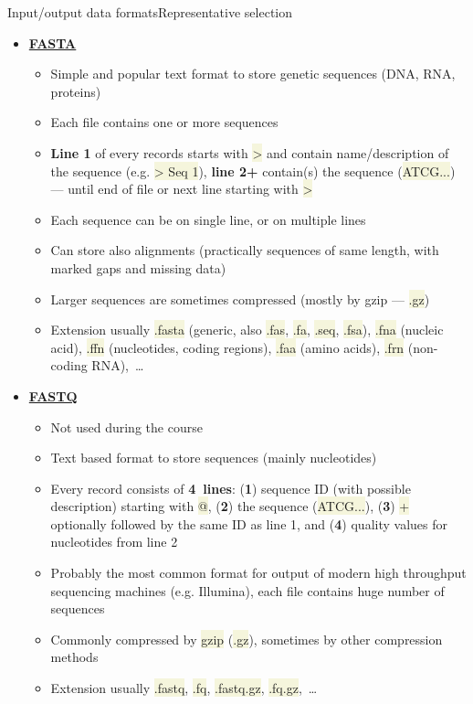 \documentclass[compress, xelatex, 11pt, xcolor=svgnames, aspectratio=169, url={hyphens, lowtilde}]{beamer}
\renewcommand{\texttt}[1]{\colorbox{Beige}{{\ttfamily #1}}}
\begin{document}
\begin{frame}[allowframebreaks]{Input/output data formats}{Representative selection}
\begin{itemize}
\begin{itemize}
		\end{itemize}
		\item \href{https://en.wikipedia.org/wiki/FASTA_format}{\textbf{FASTA}}
		\begin{itemize}
			\item Simple and popular text format to store genetic sequences (DNA, RNA, proteins)
			\item Each file contains one or more sequences
			\item \textbf{Line 1} of every records starts with \texttt{>} and contain name/description of the sequence (e.g. \texttt{> Seq 1}), \textbf{line 2+} contain(s) the sequence (\texttt{ATCG...}) --- until end of file or next line starting with \texttt{>}
			\item Each sequence can be on single line, or on multiple lines
			\item Can store also alignments (practically sequences of same length, with marked gaps and missing data)
			\item Larger sequences are sometimes compressed (mostly by gzip --- \texttt{*.gz})
			\item Extension usually \texttt{*.fasta} (generic, also \texttt{*.fas}, \texttt{*.fa}, \texttt{*.seq}, \texttt{*.fsa}), \texttt{*.fna} (nucleic acid), \texttt{*.ffn} (nucleotides, coding regions), \texttt{*.faa} (amino acids), \texttt{*.frn} (non-coding RNA),~\ldots
		\end{itemize}
		\item \href{https://en.wikipedia.org/wiki/FASTQ_format}{\textbf{FASTQ}}
		\begin{itemize}
			\item Not used during the course
			\item Text based format to store sequences (mainly nucleotides)
			\item Every record consists of \textbf{4~lines}: (\textbf{1}) sequence ID (with possible description) starting with \texttt{@}, (\textbf{2}) the sequence (\texttt{ATCG...}), (\textbf{3}) \texttt{+} optionally followed by the same ID as line 1, and (\textbf{4}) quality values for nucleotides from line 2
			\item Probably the most common format for output of modern high throughput sequencing machines (e.g. Illumina), each file contains huge number of sequences
			\item Commonly compressed by \texttt{gzip} (\texttt{*.gz}), sometimes by other compression methods
			\item Extension usually \texttt{*.fastq}, \texttt{*.fq}, \texttt{*.fastq.gz}, \texttt{*.fq.gz},~\ldots

\end{itemize}
\end{itemize}
\end{frame}
\end{document}
